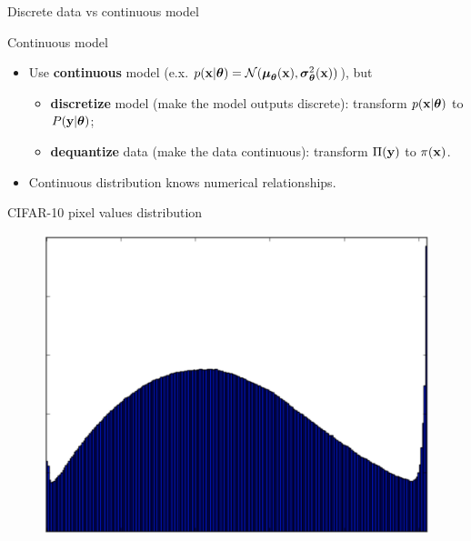 \begin{frame}{Discrete data vs continuous model}
	\begin{block}{Continuous model}
		\begin{itemize}
			\item Use \textbf{continuous} model (e.x. $p(\mathbf{x} | \boldsymbol{\theta}) = \mathcal{N}(\boldsymbol{\mu}_{\boldsymbol{\theta}}(\mathbf{x}), \boldsymbol{\sigma}_{\boldsymbol{\theta}}^2(\mathbf{x}))$), but
			\begin{itemize}
				\item \textbf{discretize} model (make the model outputs discrete): transform $p(\mathbf{x} | \boldsymbol{\theta})$ to $P(\mathbf{y} | \boldsymbol{\theta})$;
				\item \textbf{dequantize} data (make the data continuous): transform $\Pi(\mathbf{y})$ to $\pi(\mathbf{x})$.
			\end{itemize}
			\item Continuous distribution knows numerical relationships.
		\end{itemize}
	\end{block}
	\begin{block}{CIFAR-10 pixel values distribution}
		\begin{figure}
			\includegraphics[width=0.6\linewidth,height=0.2\linewidth]{figs/CIFAR_pixel_distr}
		\end{figure}
	\end{block}
\end{frame}
